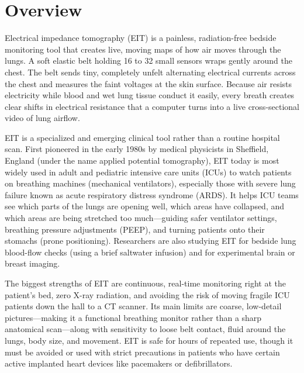 \label{ch:infographic-eit}

\section{Overview}

Electrical impedance tomography (EIT) is a painless, radiation-free bedside monitoring tool that creates live, moving maps of how air moves through the lungs. A soft elastic belt holding 16 to 32 small sensors wraps gently around the chest. The belt sends tiny, completely unfelt alternating electrical currents across the chest and measures the faint voltages at the skin surface. Because air resists electricity while blood and wet lung tissue conduct it easily, every breath creates clear shifts in electrical resistance that a computer turns into a live cross-sectional video of lung airflow.

EIT is a specialized and emerging clinical tool rather than a routine hospital scan. First pioneered in the early 1980s by medical physicists in Sheffield, England (under the name applied potential tomography), EIT today is most widely used in adult and pediatric intensive care units (ICUs) to watch patients on breathing machines (mechanical ventilators), especially those with severe lung failure known as acute respiratory distress syndrome (ARDS). It helps ICU teams see which parts of the lungs are opening well, which areas have collapsed, and which areas are being stretched too much---guiding safer ventilator settings, breathing pressure adjustments (PEEP), and turning patients onto their stomachs (prone positioning). Researchers are also studying EIT for bedside lung blood-flow checks (using a brief saltwater infusion) and for experimental brain or breast imaging.

The biggest strengths of EIT are continuous, real-time monitoring right at the patient's bed, zero X-ray radiation, and avoiding the risk of moving fragile ICU patients down the hall to a CT scanner. Its main limits are coarse, low-detail pictures---making it a functional breathing monitor rather than a sharp anatomical scan---along with sensitivity to loose belt contact, fluid around the lungs, body size, and movement. EIT is safe for hours of repeated use, though it must be avoided or used with strict precautions in patients who have certain active implanted heart devices like pacemakers or defibrillators.

